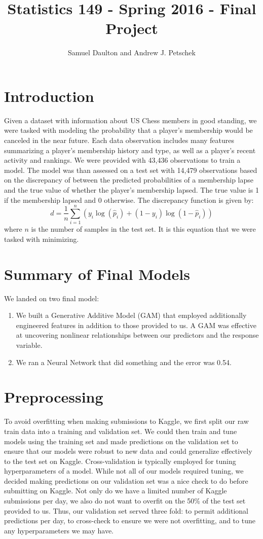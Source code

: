\documentclass[11pt, oneside]{article}   	%
\title{Statistics 149 - Spring 2016 - Final Project }
\author{Samuel Daulton and Andrew J. Petschek}
\begin{document}
\maketitle
\section*{Introduction}
Given a dataset with information about US Chess members in good standing, we were tasked with modeling the probability that a player's membership would be canceled in the near future.  Each data observation includes many features summarizing a player's membership history and type, as well as a player's recent activity and rankings.  We were provided with 43,436 observations to train a model.  The model was than assessed on a test set with 14,479 observations based on the discrepancy of between the predicted probabilities of a membership lapse and the true value of whether the player's membership lapsed.  The true value is 1 if the membership lapsed and 0 otherwise.  The discrepancy function is given by:
$$d = \frac{1}{n}\sum_{i=1}^{n}\left(y_i\log(\hat{p}_i)+(1-y_i)\log(1-\hat{p}_i)\right)$$
where $n$ is the number of samples in the test set. It is this equation that we were tasked with minimizing.
\section*{Summary of Final Models}
We landed on two final model: 
\begin{enumerate}
\item We built a Generative Additive Model (GAM) that employed additionally engineered features in addition to those provided to us. A GAM was effective at uncovering nonlinear relationships between our predictors and the response variable.
\item We ran a Neural Network that did something and the error was 0.54.  
\end{enumerate}


\section*{Preprocessing}
To avoid overfitting when making submissions to Kaggle, we first split our raw train data into a training and validation set. We could then train and tune models using the training set and made predictions on the validation set to ensure that our models were robust to new data and could generalize effectively to the test set on Kaggle. Cross-validation is typically employed for tuning hyperparameters of a model. While not all of our models required tuning, we decided making predictions on our validation set was a nice check to do before submitting on Kaggle. Not only do we have a limited number of Kaggle submissions per day, we also do not want to overfit on the 50\% of the test set provided to us. Thus, our validation set served three fold: to permit additional predictions per day, to cross-check to ensure we were not overfitting, and to tune any hyperparameters we may have.
\end{document}
